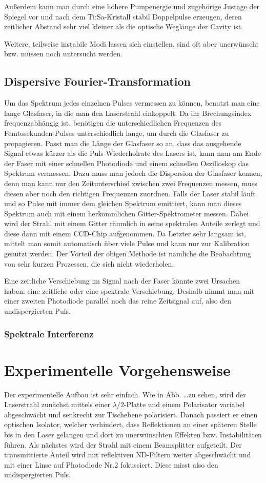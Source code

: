\documentclass[bachelor,       %
               twoside,        %
               BCOR10mm,       %
               english,ngerman, %
               ]{GAUBM}
\begin{document}
Außerdem kann man durch eine höhere Pumpenergie und zugehörige Justage der Spiegel vor und nach dem Ti:Sa-Kristall stabil Doppelpulse erzeugen, deren zeitlicher Abstand sehr viel kleiner als die optische Weglänge der Cavity ist.

Weitere, teilweise instabile Modi lassen sich einstellen, sind oft aber unerwünscht bzw. müssen noch untersucht werden.


\section{Dispersive Fourier-Transformation}
Um das Spektrum jedes einzelnen Pulses vermessen zu können, benutzt man eine lange Glasfaser, in die man den Laserstrahl einkoppelt.
Da ihr Brechungsindex frequenzabhängig ist, benötigen die unterschiedlichen Frequenzen des Femtosekunden-Pulses unterschiedlich lange, um durch die Glasfaser zu propagieren.
Passt man die Länge der Glasfaser so an, dass das ausgehende Signal etwas kürzer als die Puls-Wiederholrate des Lasers ist, kann man am Ende der Faser mit einer schnellen Photodiode und einem schnellen Oszilloskop das Spektrum vermessen.
Dazu muss man jedoch die Dispersion der Glasfaser kennen, denn man kann nur den Zeitunterschied zwischen zwei Frequenzen messen, muss diesen aber noch den richtigen Frequenzen zuordnen.
Falls der Laser stabil läuft und so Pulse mit immer dem gleichen Spektrum emittiert, kann man dieses Spektrum auch mit einem herkömmlichen Gitter-Spektrometer messen.
Dabei wird der Strahl mit einem Gitter räumlich in seine spektralen Anteile zerlegt und diese dann mit einem CCD-Chip aufgenommen.
Da Letzter sehr langsam ist, mittelt man somit automatisch über viele Pulse und kann nur zur Kalibration genutzt werden.
Der Vorteil der obigen Methode ist nämliche die Beobachtung von sehr kurzen Prozessen, die sich nicht wiederholen.

Eine zeitliche Verschiebung im Signal nach der Faser könnte zwei Ursachen haben: eine zeitliche oder eine spektrale Verschiebung.
Deshalb nimmt man mit einer zweiten Photodiode parallel noch das reine Zeitsignal auf, also den undispergierten Puls.

\subsection{Spektrale Interferenz}

\chapter{Experimentelle Vorgehensweise}
Der experimentelle Aufbau ist sehr einfach.
Wie in Abb. \dots zu sehen, wird der Laserstrahl zunächst mittels einer $\lambda/2$-Platte und einem Polarisator variabel abgeschwächt und senkrecht zur Tischebene polarisiert.
Danach passiert er einen optischen Isolator, welcher verhindert, dass Reflektionen an einer späteren Stelle bis in den Laser gelangen und dort zu unerwünschten Effekten bzw. Instabilitäten führen.
Als nächstes wird der Strahl mit einem Beamsplitter aufgeteilt.
Der transmittierte Anteil wird mit reflektiven ND-Filtern weiter abgeschwächt und mit einer Linse auf Photodiode Nr.2 fokussiert.
Diese misst also den undispergierten Puls.
\end{document}
